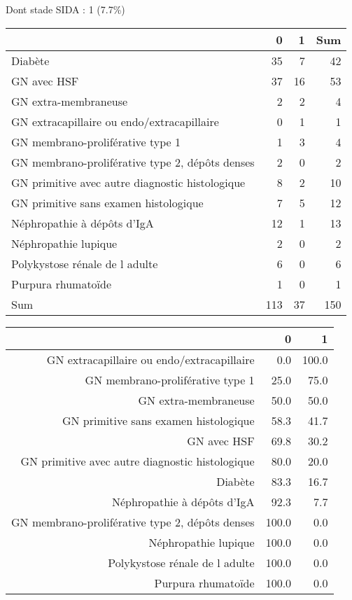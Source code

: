 \documentclass[11pt,a4paper]{article}\usepackage[]{graphicx}\usepackage[]{color}
\begin{document}
Dont stade SIDA : 1 (7.7\%)
\begin{table}[H]
\centering
\begin{tabular}{lrrr}
  \hline
 & 0 & 1 & Sum \\ 
  \hline
Diabète & 35 & 7 & 42 \\ 
  GN avec HSF & 37 & 16 & 53 \\ 
  GN extra-membraneuse & 2 & 2 & 4 \\ 
  GN extracapillaire ou endo/extracapillaire & 0 & 1 & 1 \\ 
  GN membrano-proliférative type 1 & 1 & 3 & 4 \\ 
  GN membrano-proliférative type 2, dépôts denses & 2 & 0 & 2 \\ 
  GN primitive avec autre diagnostic histologique & 8 & 2 & 10 \\ 
  GN primitive sans examen histologique & 7 & 5 & 12 \\ 
  Néphropathie à dépôts d'IgA & 12 & 1 & 13 \\ 
  Néphropathie lupique & 2 & 0 & 2 \\ 
  Polykystose rénale de l adulte & 6 & 0 & 6 \\ 
  Purpura rhumatoïde & 1 & 0 & 1 \\ 
  Sum & 113 & 37 & 150 \\ 
   \hline
\end{tabular}
\end{table}
\begin{table}[H]
\centering
\begin{tabular}{rrr}
  \hline
 & 0 & 1 \\ 
  \hline
GN extracapillaire ou endo/extracapillaire & 0.0 & 100.0 \\ 
  GN membrano-proliférative type 1 & 25.0 & 75.0 \\ 
  GN extra-membraneuse & 50.0 & 50.0 \\ 
  GN primitive sans examen histologique & 58.3 & 41.7 \\ 
  GN avec HSF & 69.8 & 30.2 \\ 
  GN primitive avec autre diagnostic histologique & 80.0 & 20.0 \\ 
  Diabète & 83.3 & 16.7 \\ 
  Néphropathie à dépôts d'IgA & 92.3 & 7.7 \\ 
  GN membrano-proliférative type 2, dépôts denses & 100.0 & 0.0 \\ 
  Néphropathie lupique & 100.0 & 0.0 \\ 
  Polykystose rénale de l adulte & 100.0 & 0.0 \\ 
  Purpura rhumatoïde & 100.0 & 0.0 \\ 
   \hline
\end{tabular}
\end{table}
\end{document}
